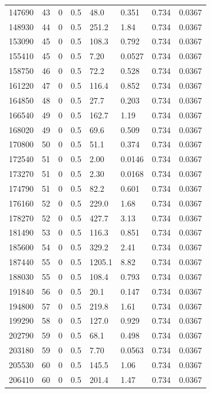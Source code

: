 \documentclass[preview]{standalone}
\begin{document}
{{{{{{{\begin{tabular}{L{1.2cm}C{1.2cm} C{0.3cm}C{0.5cm} C{1.4cm}C{1.4cm} C{1.4cm}C{1.4cm}}
  147690  &    43  & 0     & 0.5 &  48.0  & 0.351  & 0.734 &  0.0367   \\ 
  148930  &    44  & 0     & 0.5 &  251.2  & 1.84  & 0.734 &  0.0367   \\ 
  153090  &    45  & 0     & 0.5 &  108.3  & 0.792  & 0.734 &  0.0367   \\ 
  155410  &    45  & 0     & 0.5 &  7.20  & 0.0527  & 0.734 &  0.0367   \\ 
  158750  &    46  & 0     & 0.5 &  72.2  & 0.528  & 0.734 &  0.0367   \\ 
  161220  &    47  & 0     & 0.5 &  116.4  & 0.852  & 0.734 &  0.0367   \\ 
  164850  &    48  & 0     & 0.5 &  27.7  & 0.203  & 0.734 &  0.0367   \\ 
  166540  &    49  & 0     & 0.5 &  162.7  & 1.19  & 0.734 &  0.0367   \\ 
  168020  &    49  & 0     & 0.5 &  69.6  & 0.509  & 0.734 &  0.0367   \\ 
  170800  &    50  & 0     & 0.5 &  51.1  & 0.374  & 0.734 &  0.0367   \\ 
  172540  &    51  & 0     & 0.5 &  2.00  & 0.0146  & 0.734 &  0.0367   \\ 
  173270  &    51  & 0     & 0.5 &  2.30  & 0.0168  & 0.734 &  0.0367   \\ 
  174790  &    51  & 0     & 0.5 &  82.2  & 0.601  & 0.734 &  0.0367   \\ 
  176160  &    52  & 0     & 0.5 &  229.0  & 1.68  & 0.734 &  0.0367   \\ 
  178270  &    52  & 0     & 0.5 &  427.7  & 3.13  & 0.734 &  0.0367   \\ 
  181490  &    53  & 0     & 0.5 &  116.3  & 0.851  & 0.734 &  0.0367   \\ 
  185600  &    54  & 0     & 0.5 &  329.2  & 2.41  & 0.734 &  0.0367   \\ 
  187440  &    55  & 0     & 0.5 &  1205.1  & 8.82  & 0.734 &  0.0367   \\ 
  188030  &    55  & 0     & 0.5 &  108.4  & 0.793  & 0.734 &  0.0367   \\ 
  191840  &    56  & 0     & 0.5 &  20.1  & 0.147  & 0.734 &  0.0367   \\ 
  194800  &    57  & 0     & 0.5 &  219.8  & 1.61  & 0.734 &  0.0367   \\ 
  199290  &    58  & 0     & 0.5 &  127.0  & 0.929  & 0.734 &  0.0367   \\ 
  202790  &    59  & 0     & 0.5 &  68.1  & 0.498  & 0.734 &  0.0367   \\ 
  203180  &    59  & 0     & 0.5 &  7.70  & 0.0563  & 0.734 &  0.0367   \\ 
  205530  &    60  & 0     & 0.5 &  145.5  & 1.06  & 0.734 &  0.0367   \\ 
  206410  &    60  & 0     & 0.5 &  201.4  & 1.47  & 0.734 &  0.0367   \\ 
\hline 
\end{tabular} 

}}}}}}}
\end{document}
